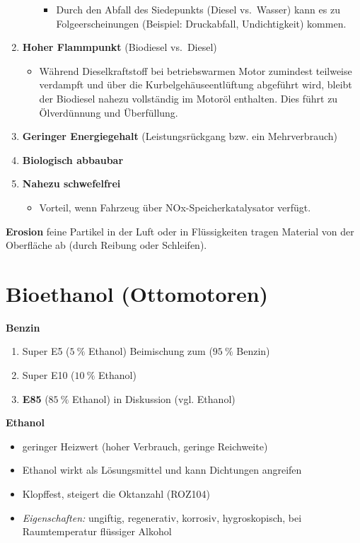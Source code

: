 \begin{enumerate}
\begin{itemize}
    \begin{itemize}
    \item
      Durch den Abfall des Siedepunkts (Diesel vs.~Wasser) kann es zu
      Folgeerscheinungen (Beispiel: Druckabfall, Undichtigkeit) kommen.
    \end{itemize}
  \end{itemize}
\item
  \textbf{Hoher Flammpunkt} (Biodiesel vs.~Diesel)

  \begin{itemize}
  \item
    Während Dieselkraftstoff bei betriebswarmen Motor zumindest
    teilweise verdampft und über die Kurbelgehäuseentlüftung abgeführt
    wird, bleibt der Biodiesel nahezu vollständig im Motoröl enthalten.
    Dies führt zu Ölverdünnung und Überfüllung.
  \end{itemize}
\item
  \textbf{Geringer Energiegehalt} (Leistungsrückgang bzw. ein
  Mehrverbrauch)
\item
  \textbf{Biologisch abbaubar}
\item
  \textbf{Nahezu schwefelfrei}

  \begin{itemize}
  \item
    Vorteil, wenn Fahrzeug über NOx-Speicherkatalysator verfügt.
  \end{itemize}
\end{enumerate}

\textbf{Erosion} feine Partikel in der Luft oder in Flüssigkeiten tragen
Material von der Oberfläche ab (durch Reibung oder Schleifen).

\section{Bioethanol (Ottomotoren)}\label{bioethanol-ottomotoren}

\textbf{Benzin}

\begin{enumerate}
\item
  Super E5 ($5~\%$ Ethanol) Beimischung zum ($95~\%$ Benzin)
\item
  Super E10 ($10~\%$ Ethanol)
\item
  \textbf{E85} ($85~\%$ Ethanol) in Diskussion (vgl. Ethanol)
\end{enumerate}

\textbf{Ethanol}

\begin{itemize}
\item
  geringer Heizwert (hoher Verbrauch, geringe Reichweite)
\item
  Ethanol wirkt als Lösungsmittel und kann Dichtungen angreifen
\item
  Klopffest, steigert die Oktanzahl (ROZ104)
\item
  \emph{Eigenschaften:} ungiftig, regenerativ, korrosiv, hygroskopisch,
  bei Raumtemperatur flüssiger Alkohol
\end{itemize}

